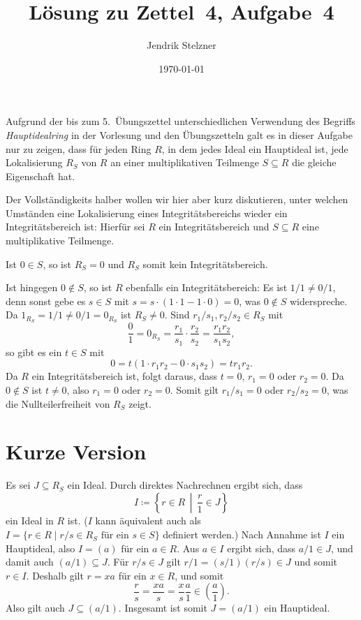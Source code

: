 \documentclass[a4paper,10pt]{scrartcl}
\title{Lösung zu Zettel~4, Aufgabe~4}
\author{Jendrik Stelzner}
\date{\today}
\begin{document}
\maketitle





\begin{remark}
  Aufgrund der bis zum 5.\ Übungszettel unterschiedlichen Verwendung des Begriffs \emph{Hauptidealring} in der Vorlesung und den Übungszetteln galt es in dieser Aufgabe nur zu zeigen, dass für jeden Ring $R$, in dem jedes Ideal ein Hauptideal ist, jede Lokalisierung $R_S$ von $R$ an einer multiplikativen Teilmenge $S \subseteq R$ die gleiche Eigenschaft hat.
  
  Der Vollständigkeits halber wollen wir hier aber kurz diskutieren, unter welchen Umständen eine Lokalisierung eines Integritätsbereichs wieder ein Integritätsbereich ist:
  Hierfür sei $R$ ein Integritätsbereich und $S \subseteq R$ eine multiplikative Teilmenge.
  
  Ist $0 \in S$, so ist $R_S = 0$ und $R_S$ somit kein Integritätsbereich.
  
  Ist hingegen $0 \notin S$, so ist $R$ ebenfalls ein Integritätsbereich:
  Es ist $1/1 \neq 0/1$, denn sonst gebe es $s \in S$ mit $s = s \cdot (1 \cdot 1 - 1 \cdot 0) = 0$, was $0 \notin S$ widerspreche.
  Da $1_{R_S} = 1/1 \neq 0/1 = 0_{R_S}$ ist $R_S \neq 0$.
  Sind $r_1/s_1, r_2/s_2 \in R_S$ mit
  \[
      \frac{0}{1}
    =  0_{R_S}
    = \frac{r_1}{s_1} \cdot \frac{r_2}{s_2}
    = \frac{r_1 r_2}{s_1 s_2},
  \]
  so gibt es ein $t \in S$ mit
  \[
      0
    = t(1 \cdot r_1 r_2 - 0 \cdot s_1 s_2)
    = t r_1 r_2.
  \]
  Da $R$ ein Integritätsbereich ist, folgt daraus, dass $t = 0$, $r_1 = 0$ oder $r_2 = 0$.
  Da $0 \notin S$ ist $t \neq 0$, also $r_1 = 0$ oder $r_2 = 0$.
  Somit gilt $r_1/s_1 = 0$ oder $r_2/s_2 = 0$, was die Nullteilerfreiheit von $R_S$ zeigt.
\end{remark}





\section{Kurze Version}

Es sei $J \subseteq R_S$ ein Ideal.
Durch direktes Nachrechnen ergibt sich, dass
\[
            I
  \coloneqq \left\{
              r \in R
            \,\middle|\,
              \frac{r}{1} \in J
            \right\}
\]
ein Ideal in $R$ ist.
($I$ kann äquivalent auch als $I = \{ r \in R \mid \text{$r/s \in R_S$ für ein $s \in S$} \}$ definiert werden.)
Nach Annahme ist $I$ ein Hauptideal, also $I = (a)$ für ein $a \in R$.
Aus $a \in I$ ergibt sich, dass $a/1 \in J$, und damit auch $(a/1) \subseteq J$.
Für $r/s \in J$ gilt $r/1 = (s/1)(r/s) \in J$ und somit $r \in I$.
Deshalb gilt $r = x a$ für ein $x \in R$, und somit
\[
      \frac{r}{s}
  =   \frac{x a}{s}
  =   \frac{x}{s} \frac{a}{1}
  \in \left( \frac{a}{1} \right).
\]
Also gilt auch $J \subseteq (a/1)$.
Insgesamt ist somit $J = (a/1)$ ein Hauptideal.
\end{document}
